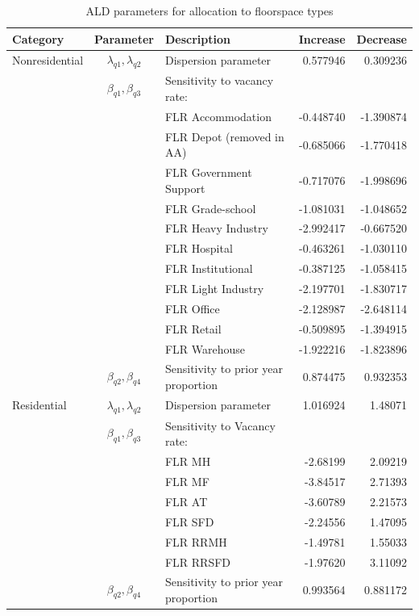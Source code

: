 \begin{table}[!t]    %
\centering
\caption{ALD parameters for allocation to floorspace types}\label{tab:floorspace-allocation-parameters}
\begin{tabular}{lclrr}
\hline
Category & Parameter & Description & Increase & Decrease \\
\hline
Nonresidential & $\lambda_{q1}, \lambda_{q2}$ & Dispersion parameter & 0.577946 & 0.309236 \\
 & $\beta_{q1}, \beta_{q3}$ & Sensitivity to vacancy rate: \\         
 & & FLR Accommodation & -0.448740 & -1.390874 \\
 & & FLR Depot (removed in AA) & -0.685066 & -1.770418 \\
 & & FLR Government Support & -0.717076 & -1.998696 \\
 & & FLR Grade-school & -1.081031 & -1.048652 \\
 & & FLR Heavy Industry & -2.992417 & -0.667520 \\
 & & FLR Hospital & -0.463261 & -1.030110 \\
 & & FLR Institutional & -0.387125 & -1.058415 \\
 & & FLR Light Industry & -2.197701 & -1.830717 \\
 & & FLR Office & -2.128987 & -2.648114 \\
 & & FLR Retail & -0.509895 & -1.394915 \\
 & & FLR Warehouse & -1.922216 & -1.823896 \\
 & $\beta_{q2}, \beta_{q4}$ & Sensitivity to prior year proportion & 0.874475 & 0.932353 \\
\hline
Residential & $\lambda_{q1}, \lambda_{q2}$ & Dispersion parameter & 1.016924 & 1.48071 \\
 & $\beta_{q1}, \beta_{q3}$ & Sensitivity to Vacancy rate: \\
 & & FLR MH & -2.68199 & 2.09219 \\
 & & FLR MF & -3.84517 & 2.71393 \\
 & & FLR AT & -3.60789 & 2.21573 \\
 & & FLR SFD & -2.24556 & 1.47095 \\
 & & FLR RRMH & -1.49781 & 1.55033 \\
 & & FLR RRSFD & -1.97620 & 3.11092 \\
 & $\beta_{q2}, \beta_{q4}$ & Sensitivity to prior year proportion & 0.993564 & 0.881172 \\
\hline
\end{tabular}
\end{table}

